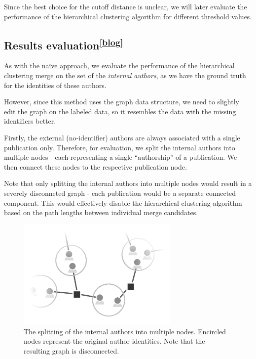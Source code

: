Since the best choice for the cutoff distance is unclear, we will later evaluate the performance of the hierarchical clustering algorithm for different threshold values.

\subsection[Results evaluation]{Results evaluation\textsuperscript{\href{https://jindrich.bar/edu/thesis-blog/inference-hierarchical/}{[blog]}}}

As with the \hyperref[sec:results-assessment]{naïve approach}, we evaluate the performance of the hierarchical clustering merge on the set of the \textit{internal authors},
as we have the ground truth for the identities of these authors.

However, since this method uses the graph data structure, we need to slightly edit the graph on the labeled data,
so it resembles the data with the missing identifiers better.

Firstly, the external (no-identifier) authors are always associated with a single publication only. 
Therefore, for evaluation, we split the internal authors into multiple nodes - each representing a single ``authorship'' of a publication.
We then connect these nodes to the respective publication node.

Note that only splitting the internal authors into multiple nodes would result in a severely disconneted graph
- each publication would be a separate connected component.
This would effectively disable the hierarchical clustering algorithm based on the path lengths between 
individual merge candidates. 

\begin{figure}[ht!]
    \captionsetup{width=.9\linewidth}
    \includegraphics[width=0.7\textwidth]{../img/merging-splitting-internals.png}
    \centering
    \caption{The splitting of the internal authors into multiple nodes. Encircled nodes represent the original author identities. Note that the resulting graph is disconnected.}
\end{figure}


